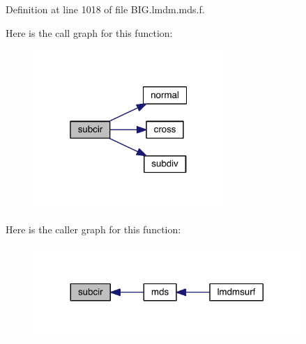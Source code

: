 Definition at line 1018 of file B\+I\+G.\+lmdm.\+mds.\+f.



Here is the call graph for this function\+:\nopagebreak
\begin{figure}[H]
\begin{center}
\leavevmode
\includegraphics[width=205pt]{_b_i_g_8lmdm_8mds_8f_a4957fbd7ab497fae37c246c1ae6d6f86_cgraph}
\end{center}
\end{figure}




Here is the caller graph for this function\+:\nopagebreak
\begin{figure}[H]
\begin{center}
\leavevmode
\includegraphics[width=287pt]{_b_i_g_8lmdm_8mds_8f_a4957fbd7ab497fae37c246c1ae6d6f86_icgraph}
\end{center}
\end{figure}


\hypertarget{_b_i_g_8lmdm_8mds_8f_aede2b2a740b771fe587f556209c97414}{}
